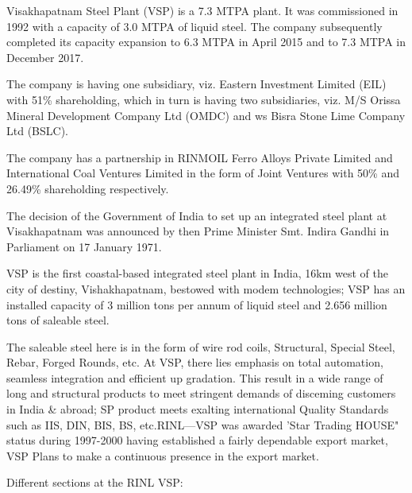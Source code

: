 \documentclass{article} %
\begin{document}
\noindent Visakhapatnam Steel Plant (VSP) is a 7.3 MTPA plant. It was commissioned in 1992 with a capacity of 3.0 MTPA of liquid steel. The company subsequently completed its capacity expansion to 6.3 MTPA in April 2015 and to 7.3 MTPA in December 2017. 

\noindent The company is having one subsidiary, viz. Eastern Investment Limited (EIL) with 51\% shareholding, which in turn is having two subsidiaries, viz. M/S Orissa Mineral Development Company Ltd (OMDC) and ws Bisra Stone Lime Company Ltd (BSLC). 

\noindent The company has a partnership in RINMOIL Ferro Alloys Private Limited and International Coal Ventures Limited in the form of Joint Ventures with 50\% and 26.49\% shareholding respectively. 

\noindent The decision of the Government of India to set up an integrated steel plant at Visakhapatnam was announced by then Prime Minister Smt. Indira Gandhi in Parliament on 17 January 1971. 

\noindent VSP is the first coastal-based integrated steel plant in India, 16km west of the city of destiny, Vishakhapatnam, bestowed with modem technologies; VSP has an installed capacity of 3 million tons per annum of liquid steel and 2.656 million tons of saleable steel. 

\noindent The saleable steel here is in the form of wire rod coils, Structural, Special Steel, Rebar, Forged Rounds, etc. At VSP, there lies emphasis on total automation, seamless integration and efficient up gradation. This result in a wide range of long and structural products to meet stringent demands of disceming customers in India \& abroad; SP product meets exalting international Quality Standards such as IIS, DIN, BIS, BS, etc.RINL---VSP was awarded 'Star Trading HOUSE" status during 1997-2000 having established a fairly dependable export market, VSP Plans to make a continuous presence in the export market.

\noindent 

\noindent Different sections at the RINL VSP: 
\end{document}
